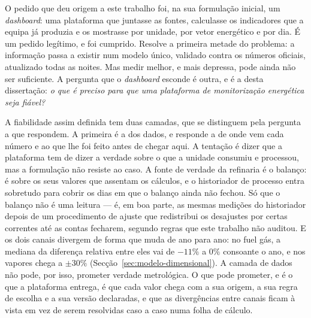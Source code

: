 O pedido que deu origem a este trabalho foi, na sua formulação inicial,
um \emph{dashboard}: uma plataforma que juntasse as fontes, calculasse
os indicadores que a equipa já produzia e os mostrasse por unidade, por
vetor energético e por dia. É um pedido legítimo, e foi cumprido. Resolve
a primeira metade do problema: a informação passa a existir num modelo
único, validado contra os números oficiais, atualizado todas as noites.
Mas medir melhor, e mais depressa, pode ainda não ser suficiente. A pergunta que o
\emph{dashboard} esconde é outra, e é a desta dissertação: \emph{o que é
preciso para que uma plataforma de monitorização energética seja
fiável?}


A fiabilidade assim definida tem duas camadas, que se
distinguem pela pergunta a que respondem. A primeira é a dos dados, e
responde a de onde vem cada número e ao que lhe foi feito antes de
chegar aqui. A tentação é dizer que a plataforma tem de dizer a verdade
sobre o que a unidade consumiu e processou, mas a formulação não resiste
ao caso. A fonte de verdade da refinaria é o balanço: é sobre os seus
valores que assentam os cálculos, e o historiador de processo entra
sobretudo para cobrir os dias em que o balanço ainda não fechou. Só que
o balanço não é uma leitura --- é, em boa parte, as mesmas medições do
historiador depois de um procedimento de ajuste que redistribui os
desajustes por certas correntes até as contas fecharem, segundo regras
que este trabalho não auditou. E os dois canais divergem de forma que
muda de ano para ano: no fuel gás, a mediana da diferença relativa entre
eles vai de $-11\%$ a $0\%$ consoante o ano, e nos vapores chega a
$\pm30\%$ (Secção~\ref{sec:modelo-dimensional}). A camada de dados não
pode, por isso, prometer verdade metrológica. O que pode prometer, e é o
que a plataforma entrega, é que cada valor chega com a sua origem, a sua
regra de escolha e a sua versão declaradas, e que as divergências entre
canais ficam à vista em vez de serem resolvidas caso a caso numa folha
de cálculo.

